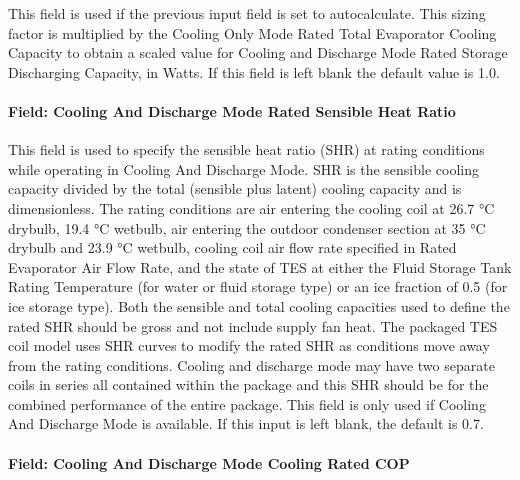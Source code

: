 This field is used if the previous input field is set to autocalculate. This sizing factor is multiplied by the Cooling Only Mode Rated Total Evaporator Cooling Capacity to obtain a scaled value for Cooling and Discharge Mode Rated Storage Discharging Capacity, in Watts. If this field is left blank the default value is 1.0.

\paragraph{Field: Cooling And Discharge Mode Rated Sensible Heat Ratio}\label{field-cooling-and-discharge-mode-rated-sensible-heat-ratio}

This field is used to specify the sensible heat ratio (SHR) at rating conditions while operating in Cooling And Discharge Mode. SHR is the sensible cooling capacity divided by the total (sensible plus latent) cooling capacity and is dimensionless. The rating conditions are air entering the cooling coil at 26.7 °C drybulb, 19.4 °C wetbulb, air entering the outdoor condenser section at 35 °C drybulb and 23.9 °C wetbulb, cooling coil air flow rate specified in Rated Evaporator Air Flow Rate, and the state of TES at either the Fluid Storage Tank Rating Temperature (for water or fluid storage type) or an ice fraction of 0.5 (for ice storage type). Both the sensible and total cooling capacities used to define the rated SHR should be gross and not include supply fan heat. The packaged TES coil model uses SHR curves to modify the rated SHR as conditions move away from the rating conditions. Cooling and discharge mode may have two separate coils in series all contained within the package and this SHR should be for the combined performance of the entire package. This field is only used if Cooling And Discharge Mode is available. If this input is left blank, the default is 0.7.

\paragraph{Field: Cooling And Discharge Mode Cooling Rated COP}\label{field-cooling-and-discharge-mode-cooling-rated-cop}


